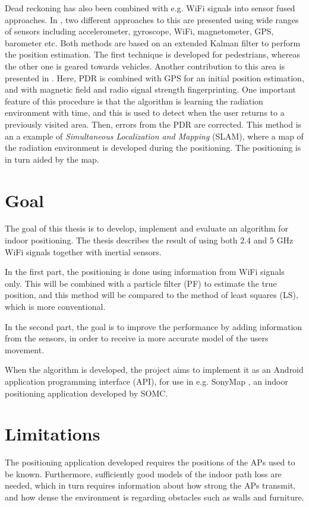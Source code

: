 \documentclass{LTHthesis}
\begin{document}
Dead reckoning has also been combined with e.g. WiFi signals into sensor fused approaches. In \cite{inteli_nav,navio}, two different approaches to this are presented using wide ranges of sensors including accelerometer, gyroscope, WiFi, magnetometer, GPS, barometer etc. Both methods are based on an extended Kalman filter to perform the position estimation. The first technique is developed for pedestrians, whereas the other one is geared towards vehicles. Another contribution to this area is presented in \cite{closer_to_everywhere}. Here, PDR is combined with GPS for an initial position estimation, and with magnetic field and radio signal strength fingerprinting. One important feature of this procedure is that the algorithm is learning the radiation environment with time, and this is used to detect when the user returns to a previously visited area. Then, errors from the PDR are corrected. This method is an a example of \emph{Simultaneous Localization and Mapping} (SLAM), where a map of the radiation environment is developed during the positioning. The positioning is in turn aided by the map.



\section{Goal}

The goal of this thesis is to develop, implement and evaluate an algorithm for indoor positioning. The thesis describes the result of using both 2.4 and 5 GHz WiFi signals together with inertial sensors.

In the first part, the positioning is done using information from WiFi signals only. This will be combined with a particle filter (PF) to estimate the true position, and this method will be compared to the method of least squares (LS), which is more conventional.

In the second part, the goal is to improve the performance by adding information from the sensors, in order to receive ia more accurate model of the users movement.

When the algorithm is developed, the project aims to implement it as an Android application programming interface (API), for use in e.g. SonyMap \cite{sonymap}, an indoor positioning application developed by SOMC.

\section{Limitations}
%
The positioning application developed requires the positions of the APs used to be known. Furthermore, sufficiently good models of the indoor path loss are needed, which in turn requires information about how strong the APs transmit, and how dense the environment is regarding obstacles such as walls and furniture. 
\end{document}
